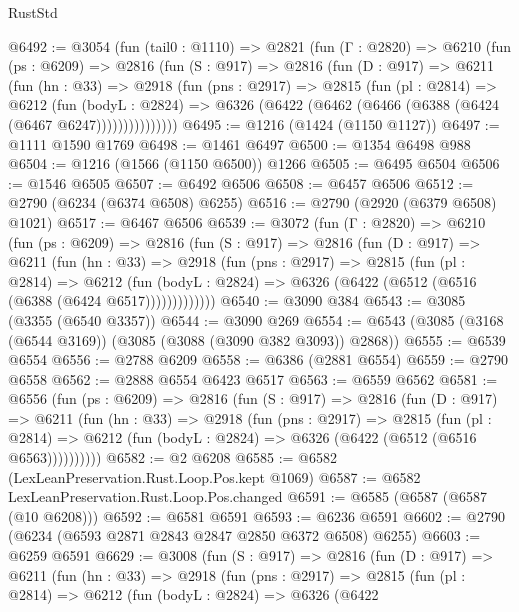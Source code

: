 \begin{lexlean}{RustStd}
\begin{coremodule}
{\begin{coremodule}
{{{{{{{{{{{{{{{{{{{{{{{{{{@6492 := @3054
    (fun (tail0 : @1110) =>
    @2821
      (fun (Γ : @2820) =>
      @6210
        (fun (ps : @6209) =>
        @2816
          (fun (S : @917) =>
          @2816
            (fun (D : @917) =>
            @6211
              (fun (hn : @33) =>
              @2918
                (fun (pns : @2917) =>
                @2815
                  (fun (pl : @2814) =>
                  @6212
                    (fun (bodyL : @2824) =>
                    @6326 (@6422 (@6462 (@6466 (@6388 (@6424 (@6467 @6247)))))))))))))))
@6495 := @1216 (@1424 (@1150 @1127))
@6497 := @1111 @1590 @1769
@6498 := @1461 @6497
@6500 := @1354 @6498 @988
@6504 := @1216 (@1566 (@1150 @6500)) @1266
@6505 := @6495 @6504
@6506 := @1546 @6505
@6507 := @6492 @6506
@6508 := @6457 @6506
@6512 := @2790 (@6234 (@6374 @6508) @6255)
@6516 := @2790 (@2920 (@6379 @6508) @1021)
@6517 := @6467 @6506
@6539 := @3072
    (fun (Γ : @2820) =>
    @6210
      (fun (ps : @6209) =>
      @2816
        (fun (S : @917) =>
        @2816
          (fun (D : @917) =>
          @6211
            (fun (hn : @33) =>
            @2918
              (fun (pns : @2917) =>
              @2815
                (fun (pl : @2814) =>
                @6212
                  (fun (bodyL : @2824) =>
                  @6326 (@6422 (@6512 (@6516 (@6388 (@6424 @6517)))))))))))))
@6540 := @3090 @384
@6543 := @3085 (@3355 (@6540 @3357))
@6544 := @3090 @269
@6554 := @6543 (@3085 (@3168 (@6544 @3169)) (@3085 (@3088 (@3090 @382 @3093)) @2868))
@6555 := @6539 @6554
@6556 := @2788 @6209
@6558 := @6386 (@2881 @6554)
@6559 := @2790 @6558
@6562 := @2888 @6554 @6423 @6517
@6563 := @6559 @6562
@6581 := @6556
    (fun (ps : @6209) =>
    @2816
      (fun (S : @917) =>
      @2816
        (fun (D : @917) =>
        @6211
          (fun (hn : @33) =>
          @2918
            (fun (pns : @2917) =>
            @2815
              (fun (pl : @2814) =>
              @6212 (fun (bodyL : @2824) => @6326 (@6422 (@6512 (@6516 @6563))))))))))
@6582 := @2 @6208
@6585 := @6582 (LexLeanPreservation.Rust.Loop.Pos.kept @1069)
@6587 := @6582 LexLeanPreservation.Rust.Loop.Pos.changed
@6591 := @6585 (@6587 (@6587 (@10 @6208)))
@6592 := @6581 @6591
@6593 := @6236 @6591
@6602 := @2790 (@6234 (@6593 @2871 @2843 @2847 @2850 @6372 @6508) @6255)
@6603 := @6259 @6591
@6629 := @3008
    (fun (S : @917) =>
    @2816
      (fun (D : @917) =>
      @6211
        (fun (hn : @33) =>
        @2918
          (fun (pns : @2917) =>
          @2815
            (fun (pl : @2814) =>
            @6212
              (fun (bodyL : @2824) =>
              @6326
                (@6422
}}}}}}}}}}}}}}}}}}}}}}}}}}
\end{coremodule}}
\end{coremodule}
\end{lexlean}
